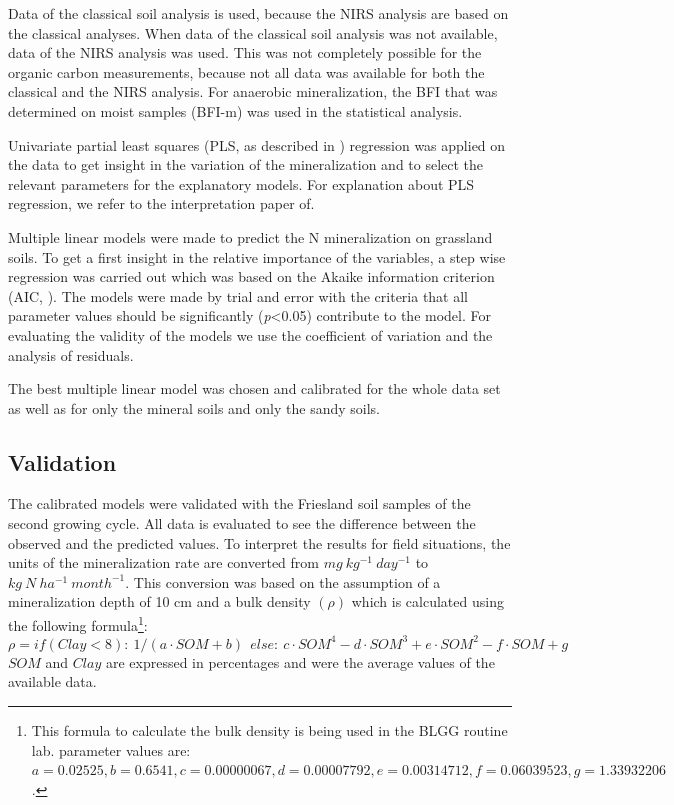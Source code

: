 \documentclass[10pt,twoside,dutch,english]{report}
\begin{document}
Data of the classical soil analysis is used, because the NIRS analysis are based on the classical analyses. When data of the classical soil analysis was not available, data of the NIRS analysis was used. This was not completely possible for the organic carbon measurements, because not all data was available for both the classical and the NIRS analysis. For anaerobic mineralization, the BFI that was determined on moist samples (BFI-m) was used in the statistical analysis. 


Univariate partial least squares (PLS, as described in \citet{Mevik2013}) regression was applied on the data to get insight in the variation of the mineralization and to select the relevant parameters for the explanatory models. For explanation about PLS regression, we refer to the interpretation paper of\citet{Garthwaite1994}. 


Multiple linear models were made to predict the N mineralization on grassland soils. To get a first insight in the relative importance of the variables, a step wise regression was carried out which was based on the Akaike information criterion (AIC, \citep{Sakamoto1986}). The models were made by trial and error with the criteria that all parameter values should be significantly (\textit{p}<0.05) contribute to the model. For evaluating the validity of the models we use the coefficient of variation and the analysis of residuals. 

The best multiple linear model was chosen and calibrated for the whole data set as well as for only the mineral soils and only the sandy soils. 

\subsection{Validation}
The calibrated models were validated with the Friesland soil samples of the second growing cycle. All data is evaluated to see the difference between the observed and the predicted values.  To interpret the results for field situations,  the units of the mineralization rate are converted from $mg\: kg^{-1}\: day^{-1}$ to $kg\:N\:ha^{-1}\: month^{-1}$. This conversion was based on the assumption of a mineralization depth of 10 cm and a  bulk density $(\rho)$ which is calculated using the following formula\footnote{This formula to calculate the bulk density is being used in the BLGG routine lab. parameter values are: $a=0.02525, b=0.6541, c=0.00000067, d=0.00007792, e=0.00314712, f=0.06039523, g=1.33932206$. }:
\[\rho = if (Clay<8):\: {1/(a\cdot SOM+b)} \:\:else:\: {c\cdot SOM^4-d\cdot SOM^3+e\cdot SOM^2-f\cdot SOM+g}\]
$SOM$ and $Clay$ are expressed in percentages and were the average values of the available data. 
\end{document}
